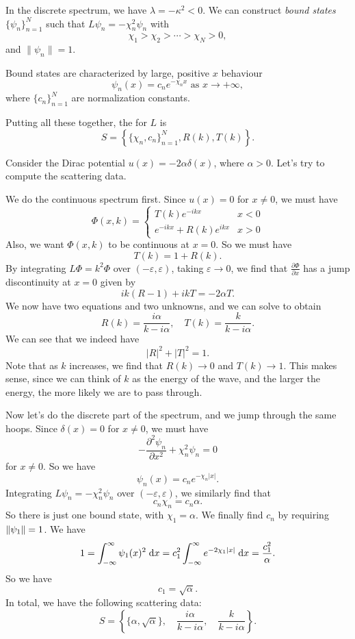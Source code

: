 \documentclass[a4paper]{article}
\begin{document}
In the discrete spectrum, we have $\lambda = - \kappa^2 < 0$. We can construct \emph{bound states} $\{\psi_n\}_{n = 1}^N$ such that $L\psi_n = - \chi_n^2 \psi_n$ with
\[
  \chi_1 > \chi_2 > \cdots > \chi_N > 0,
\]
and $\|\psi_n\| = 1$.

Bound states are characterized by large, positive $x$ behaviour
\[
  \psi_n(x) = c_n e^{-\chi_n x}\text{ as }x \to +\infty,
\]
where $\{c_n\}_{n = 1}^N$ are normalization constants.

Putting all these together, the  for $L$ is
\[
  S = \left\{\{\chi_n, c_n\}_{n = 1}^N, R(k), T(k)\right\}.
\]
\begin{eg}
  Consider the Dirac potential $u(x) = - 2 \alpha \delta(x)$, where $\alpha > 0$. Let's try to compute the scattering data.

  We do the continuous spectrum first. Since $u(x) = 0$ for $x \not= 0$, we must have
  \[
    \Phi(x, k) =
    \begin{cases}
      T(k) e^{-ikx} & x < 0\\
      e^{-ikx} + R(k) e^{ikx} & x > 0
    \end{cases}
  \]
  Also, we want $\Phi(x, k)$ to be continuous at $x = 0$. So we must have
  \[
    T(k) = 1 + R(k).
  \]
  By integrating $L\Phi = k^2 \Phi$ over $(-\varepsilon, \varepsilon)$, taking $\varepsilon \to 0$, we find that $\frac{\partial \Phi}{\partial x}$ has a jump discontinuity at $x = 0$ given by
  \[
    ik(R - 1) + ikT = -2 \alpha T.
  \]
  We now have two equations and two unknowns, and we can solve to obtain
  \[
    R(k) = \frac{i\alpha}{k - i\alpha},\quad T(k) = \frac{k}{k - i \alpha}.
  \]
  We can see that we indeed have
  \[
    |R|^2 + |T|^2 = 1.
  \]
  Note that as $k$ increases, we find that $R(k) \to 0$ and $T(k) \to 1$. This makes sense, since we can think of $k$ as the energy of the wave, and the larger the energy, the more likely we are to pass through.

  Now let's do the discrete part of the spectrum, and we jump through the same hoops. Since $\delta(x) = 0$ for $x \not= 0$, we must have
  \[
    -\frac{\partial^2 \psi_n}{\partial x^2} + \chi_n^2 \psi_n = 0
  \]
  for $x \not= 0$. So we have
  \[
    \psi_n(x) = c_n e^{- \chi_n |x|}.
  \]
  Integrating $L\psi_n = - \chi_n^2 \psi_n$ over $(-\varepsilon, \varepsilon)$, we similarly find that
  \[
    c_n \chi_n = c_n \alpha.
  \]
  So there is just one bound state, with $\chi_1 = \alpha$. We finally find $c_n$ by requiring $\left\lVert \psi_1\right\rVert = 1$. We have
  \[
    1 = \int_{-\infty}^\infty \psi_1(x)^2 \;\mathrm{d} x = c_1^2 \int_{-\infty}^\infty e^{-2 \chi_1|x|}\;\mathrm{d} x = \frac{c_1^2}{\alpha}.
  \]
  So we have
  \[
    c_1 = \sqrt{\alpha}.
  \]
  In total, we have the following scattering data:
  \[
    S = \left\{\{\alpha, \sqrt{\alpha}\},\quad \frac{i\alpha}{k - i \alpha},\quad \frac{k}{k - i\alpha}\right\}.
  \]
\end{eg}
\end{document}
